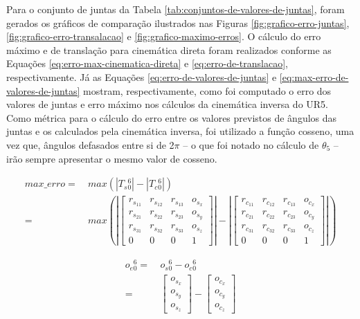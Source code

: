 Para o conjunto de juntas da Tabela \ref{tab:conjuntos-de-valores-de-juntas}, foram gerados os gráficos de comparação
ilustrados nas Figuras \ref{fig:grafico-erro-juntas}, \ref{fig:grafico-erro-transalacao} e
\ref{fig:grafico-maximo-erros}. O cálculo do erro máximo e de translação para cinemática direta
foram realizados conforme as Equações \ref{eq:erro-max-cinematica-direta} e \ref{eq:erro-de-translacao},
respectivamente. Já as Equações \ref{eq:erro-de-valores-de-juntas} e \ref{eq:max-erro-de-valores-de-juntas}
mostram, respectivamente, como foi computado o erro dos valores de juntas e erro máximo nos
cálculos da cinemática inversa do UR5. Como métrica para o cálculo do erro entre os valores 
previstos de ângulos das juntas e os  calculados pela cinemática inversa, foi utilizado a função cosseno,
uma vez que, ângulos defasados entre si de 2$\pi$ – o que foi notado no cálculo de $\theta_{5}$ – irão sempre
apresentar o mesmo valor de cosseno.

\begin{equation}\label{eq:erro-max-cinematica-direta}
	\begin{split}
		max\_erro = &\: max \left (\left | T_s{_{0}^{6}}\right | - \left | T_c{_{0}^{6}}\right | \right) \quad \quad\\
		= &\: max \left ( \left |
		\begin{bmatrix}
			r_{s_{11}} & r_{s_{12}} & r_{s_{13}} & o_{s_{x}} \\ 
			r_{s_{21}} & r_{s_{22}} & r_{s_{23}} & o_{s_{y}} \\ 
			r_{s_{31}} & r_{s_{32}} & r_{s_{33}} & o_{s_{z}} \\ 
			    0      &      0     &      0     &      1
		\end{bmatrix}
		\right |
		-
		\left |
		\begin{bmatrix}
			r_{c_{11}} & r_{c_{12}} & r_{c_{13}} & o_{c_{x}} \\ 
			r_{c_{21}} & r_{c_{22}} & r_{c_{23}} & o_{c_{y}} \\ 
			r_{c_{31}} & r_{c_{32}} & r_{c_{33}} & o_{c_{z}} \\ 
			    0      &      0     &      0     &      1
		\end{bmatrix}
		\right | \right )
	\end{split}
\end{equation}

\begin{equation}\label{eq:erro-de-translacao}
	\begin{split}
		o_e{_{0}^{6}} = &\: o_s{_{0}^{6}} - o_c{_{0}^{6}}\\
		= &\:
		\begin{bmatrix}
			o_{s_{x}} \\ 
			o_{s_{y}} \\ 
			o_{s_{z}}
		\end{bmatrix}
		-
		\begin{bmatrix}
			o_{c_{x}} \\ 
			o_{c_{y}} \\ 
			o_{c_{z}}
		\end{bmatrix}
	\end{split}
\end{equation}


